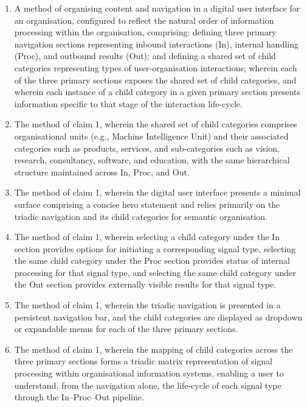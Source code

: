 \documentclass[11pt,a4paper]{article}
\begin{document}
\begin{enumerate}
  \item A method of organising content and navigation in a digital user interface for an organisation, configured to reflect the natural order of information processing within the organisation, comprising: defining three primary navigation sections representing inbound interactions (In), internal handling (Proc), and outbound results (Out); and defining a shared set of child categories representing types of user-organisation interactions; wherein each of the three primary sections exposes the shared set of child categories, and wherein each instance of a child category in a given primary section presents information specific to that stage of the interaction life-cycle.

  \item The method of claim 1, wherein the shared set of child categories comprises organisational units (e.g., Machine Intelligence Unit) and their associated categories such as products, services, and sub-categories such as vision, research, consultancy, software, and education, with the same hierarchical structure maintained across In, Proc, and Out.

  \item The method of claim 1, wherein the digital user interface presents a minimal surface comprising a concise hero statement and relies primarily on the triadic navigation and its child categories for semantic organisation.

  \item The method of claim 1, wherein selecting a child category under the In section provides options for initiating a corresponding signal type, selecting the same child category under the Proc section provides status of internal processing for that signal type, and selecting the same child category under the Out section provides externally visible results for that signal type.

  \item The method of claim 1, wherein the triadic navigation is presented in a persistent navigation bar, and the child categories are displayed as dropdown or expandable menus for each of the three primary sections.

  \item The method of claim 1, wherein the mapping of child categories across the three primary sections forms a triadic matrix representation of signal processing within organisational information systems, enabling a user to understand, from the navigation alone, the life-cycle of each signal type through the In--Proc--Out pipeline.


\end{enumerate}
\end{document}
